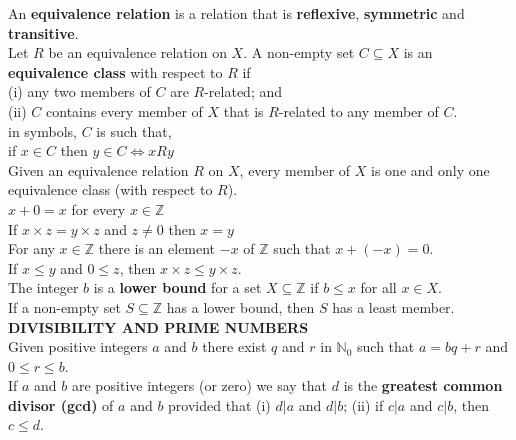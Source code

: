 \documentclass[10pt,landscape]{article}
\begin{document}
\begin{multicols}{4}
An \textbf{equivalence relation} is a relation that is \textbf{reflexive},
\textbf{symmetric} and \textbf{transitive}.\\

Let $R$ be an equivalence relation on $X$. A non-empty set $C
\subseteq X$ is an \textbf{equivalence class} with respect to $R$ if\\

(i) any two members of $C$ are $R$-related; and\\

(ii) $C$ contains every member of $X$ that is $R$-related to any
member of $C$.\\

in symbols, $C$ is such that,\\
if $x \in C$ then $y \in C \iff xRy$\\

Given an equivalence relation $R$ on $X$, every member of $X$ is one
and only one equivalence class (with respect to $R$).\\

$x + 0 = x$ for every $x \in \mathbb{Z}$\\

If $x \times z = y \times z$ and $z \neq 0$ then $x = y$\\

For any $x \in \mathbb{Z}$ there is an element $-x$ of $\mathbb{Z}$
such that $x +(-x)=0$.\\

If $x \leq y$ and $0 \leq z$, then $x \times z \leq y \times z$.\\

The integer $b$ is a \textbf{lower bound} for a set $X \subseteq
\mathbb{Z}$ if $b \leq x$ for all $x \in X$.\\

If a non-empty set $S \subseteq \mathbb{Z}$ has a lower bound, then
$S$ has a least member.\\


\textbf{DIVISIBILITY AND PRIME NUMBERS}\\
Given positive integers $a$ and $b$ there exist $q$ and $r$ in
$\mathbb{N}_0$ such that $a = bq + r$ and $0 \leq r \leq b$. \\

If $a$ and $b$ are positive integers (or zero) we say that $d$ is the
\textbf{greatest common divisor (gcd)} of $a$ and $b$ provided that
(i) $d|a$ and $d|b$; (ii) if $c|a$ and $c|b$, then $c \leq d$.\\


\end{multicols}
\end{document}
